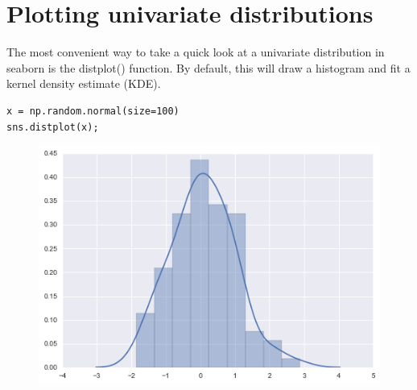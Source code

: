 \documentclass{beamer}
\begin{document}
\section{Plotting univariate distributions}
\begin{frame}[fragile]
The most convenient way to take a quick look at a univariate distribution in seaborn is the distplot() function. By default, this will draw a histogram and fit a kernel density estimate (KDE).

\begin{verbatim}
x = np.random.normal(size=100)
sns.distplot(x);
\end{verbatim}

\begin{figure}
	\centering
	\includegraphics[width=0.7\linewidth]{images/distributions_8_0}
	\caption{}
	\label{fig:distributions_8_0}
\end{figure}

\end{frame}
\end{document}
